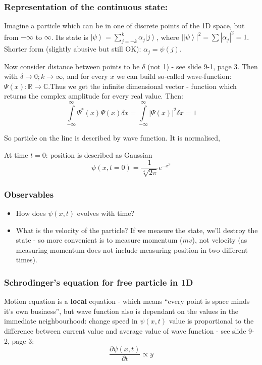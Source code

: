 \documentclass{scrartcl}
\newcommand{\cplx}{\mathbb{C}} %
\newcommand{\bigR}{\mathbb{R}} %
\newcommand{\ket}[1]{\left| #1 \right>} %
\begin{document}
\subsubsection*{ Representation of the continuous state:}

Imagine a particle which can be in one of discrete points of the 1D space, but
from $-\infty$ to $\infty$. Its state is $\ket\psi = \sum\limits_{j=-k}^{k}
\alpha_j \ket j$, where $|\ket\psi|^2 = \sum|\alpha_j|^2 = 1$. Shorter form
(slightly abusive but still OK): $\alpha_j = \psi(j)$.

Now consider distance between points to be $\delta$ (not 1) - see slide 9-1,
page 3. Then with $\delta \to 0; k \to \infty$, and for every $x$ we can build
so-called wave-function: $\Psi(x): \bigR \to \cplx$.Thus we get the infinite
dimensional vector - function which returns the complex amplitude for every real
value. Then:
$$\int \limits_{-\infty}^\infty \Psi^*(x) \Psi(x) \delta x =\int
\limits_{-\infty}^\infty |\Psi(x)|^2 \delta x = 1$$

So particle on the line is described by wave function. It is normalised,

At time $t = 0$: position is described as Gaussian
$$\psi(x, t=0) = \frac1{\sqrt[4]{2\pi}} e ^{-x^2}$$ 

\subsubsection*{Observables}

\begin{itemize}
\item How does $\psi(x, t)$ evolves with time?
\item What is the velocity of the particle? If we measure the state, we'll
  destroy the state - so more convenient is to measure momentum ($mv$), not
  velocity (as measuring momentum does not include measuring position in two
  different times).
\end{itemize}

\subsubsection*{Schrodinger's equation for free particle in 1D}
Motion equation is a {\bf local} equation - which means ``every point is space
minds it's own business'', but wave function also is dependant on the values in
the immediate neighbourhood: change speed in $\psi(x,t)$ value is proportional
to the difference between current value and average value of wave function - see
slide 9-2, page 3:
 $$\frac{\partial\psi(x, t)}{\partial t}  \propto y $$
\end{document}
